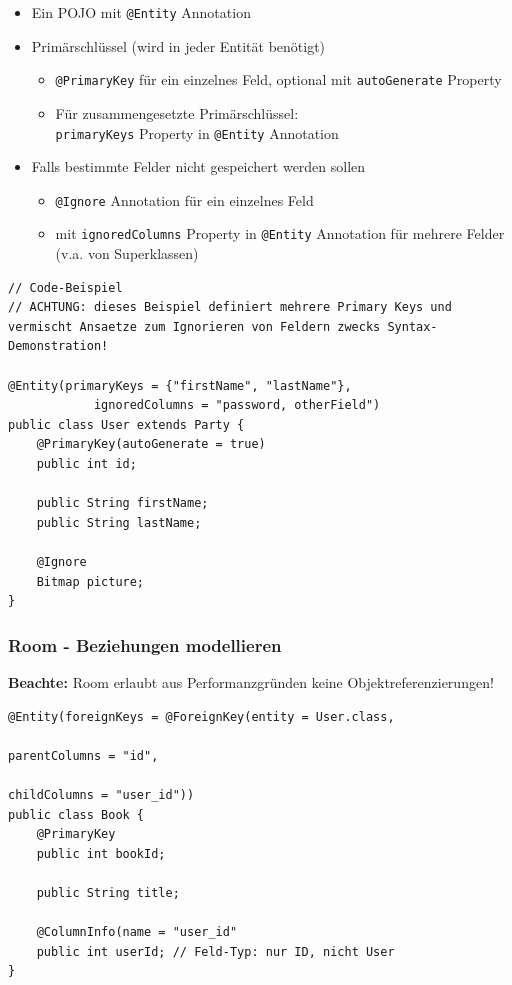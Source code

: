 \documentclass[a4paper]{article}
\begin{document}
\begin{itemize}
	\item Ein POJO mit \texttt{@Entity} Annotation
	\item Primärschlüssel (wird in jeder Entität benötigt)
		\begin{itemize}
			\item \texttt{@PrimaryKey} für ein einzelnes Feld, optional mit \texttt{autoGenerate} Property
			\item Für zusammengesetzte Primärschlüssel:\\
			\texttt{primaryKeys} Property in \texttt{@Entity} Annotation
		\end{itemize}
	\item Falls bestimmte Felder nicht gespeichert werden sollen
		\begin{itemize}
			\item \texttt{@Ignore} Annotation für ein einzelnes Feld
			\item mit \texttt{ignoredColumns} Property in \texttt{@Entity} Annotation für mehrere Felder \\
			(v.a. von Superklassen)
		\end{itemize}
\end{itemize}

\begin{lstlisting}
// Code-Beispiel
// ACHTUNG: dieses Beispiel definiert mehrere Primary Keys und vermischt Ansaetze zum Ignorieren von Feldern zwecks Syntax-Demonstration!

@Entity(primaryKeys = {"firstName", "lastName"},
			ignoredColumns = "password, otherField")
public class User extends Party {
	@PrimaryKey(autoGenerate = true)
	public int id;
	
	public String firstName;
	public String lastName;
	
	@Ignore
	Bitmap picture;
}
\end{lstlisting}

\subsubsection{Room - Beziehungen modellieren}

\textbf{Beachte:} Room erlaubt aus Performanzgründen keine Objektreferenzierungen!

\begin{lstlisting}
@Entity(foreignKeys = @ForeignKey(entity = User.class,
															parentColumns = "id",
															childColumns = "user_id"))
public class Book {
	@PrimaryKey
	public int bookId;
	
	public String title;
	
	@ColumnInfo(name = "user_id"
	public int userId; // Feld-Typ: nur ID, nicht User
}
\end{lstlisting}
\end{document}
